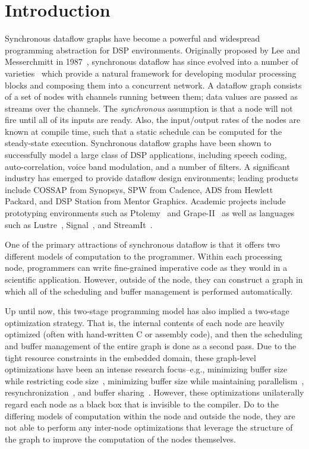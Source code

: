 \section{Introduction}

Synchronous dataflow graphs have become a powerful and widespread
programming abstraction for DSP environments.  Originally proposed by
Lee and Messerchmitt in 1987~\cite{LM87-i}, synchronous dataflow has
since evolved into a number of
varieties~\cite{BELP96,Bhatt00,Murthy2002,Buck93} which provide a
natural framework for developing modular processing blocks and
composing them into a concurrent network.  A dataflow graph consists
of a set of nodes with channels running between them; data values are
passed as streams over the channels.  The {\it synchronous} assumption
is that a node will not fire until all of its inputs are ready.  Also,
the input/output rates of the nodes are known at compile time, such
that a static schedule can be computed for the steady-state execution.
Synchronous dataflow graphs have been shown to successfully model a
large class of DSP applications, including speech coding,
auto-correlation, voice band modulation, and a number of filters.  A
significant industry has emerged to provide dataflow design
environments; leading products include COSSAP from Synopsys, SPW from
Cadence, ADS from Hewlett Packard, and DSP Station from Mentor
Graphics.  Academic projects include prototyping environments such as
Ptolemy~\cite{Lee01} and Grape-II~\cite{Lauw95} as well as languages
such as Lustre~\cite{lustre}, Signal~\cite{Gaut87}, and
StreamIt~\cite{Gordo02}.

One of the primary attractions of synchronous dataflow is that it
offers two different models of computation to the programmer.  Within
each processing node, programmers can write fine-grained imperative
code as they would in a scientific application.  However, outside of
the node, they can construct a graph in which all of the scheduling
and buffer management is performed automatically.

Up until now, this two-stage programming model has also implied a
two-stage optimization strategy.  That is, the internal contents of
each node are heavily optimized (often with hand-written C or assembly
code), and then the scheduling and buffer management of the entire
graph is done as a second pass.  Due to the tight resource constraints
in the embedded domain, these graph-level optimizations have been an
intense research focus--e.g., minimizing buffer size while restricting
code size~\cite{murt1997x1}, minimizing buffer size while maintaining
parallelism~\cite{GGD94}, resynchronization~\cite{Bhatta2000}, and
buffer sharing~\cite{murt2001x1}.  However, these optimizations
unilaterally regard each node as a black box that is invisible to the
compiler.  Do to the differing models of computation within the node
and outside the node, they are not able to perform any inter-node
optimizations that leverage the structure of the graph to improve the
computation of the nodes themselves.

